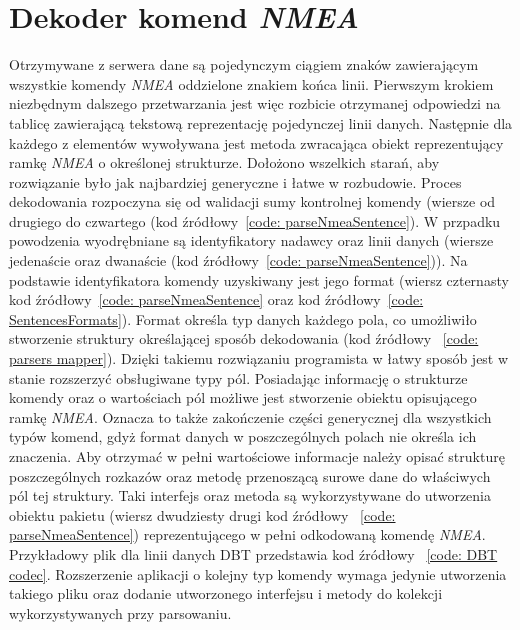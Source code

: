 \documentclass[skorowidz,skroty]{dyplomWEZUT}
\begin{document}
\section{Dekoder komend \textit{NMEA}}\label{sec: NMEA parser}
Otrzymywane z serwera dane są pojedynczym ciągiem znaków zawierającym wszystkie komendy \textit{NMEA} oddzielone znakiem końca linii. Pierwszym krokiem niezbędnym dalszego przetwarzania jest więc rozbicie otrzymanej odpowiedzi na tablicę zawierającą tekstową reprezentację pojedynczej linii danych. Następnie dla każdego z elementów wywoływana jest metoda zwracająca obiekt reprezentujący ramkę \textit{NMEA} o określonej strukturze. Dołożono wszelkich starań, aby rozwiązanie było jak najbardziej generyczne i łatwe w rozbudowie. Proces dekodowania rozpoczyna się od walidacji sumy kontrolnej komendy (wiersze od drugiego do czwartego (kod źródłowy~\ref{code: parseNmeaSentence}). W przpadku powodzenia wyodrębniane są identyfikatory nadawcy oraz linii danych (wiersze jedenaście oraz dwanaście (kod źródłowy~\ref{code: parseNmeaSentence})). Na podstawie identyfikatora komendy uzyskiwany jest jego format (wiersz czternasty kod źródłowy~\ref{code: parseNmeaSentence} oraz kod źródłowy~\ref{code: SentencesFormats}). Format określa typ danych każdego pola, co umożliwiło stworzenie struktury określającej sposób dekodowania (kod źródłowy ~\ref{code: parsers mapper}). Dzięki takiemu rozwiązaniu programista w łatwy sposób jest w stanie rozszerzyć obsługiwane typy pól. Posiadając informację o strukturze komendy oraz o wartościach pól możliwe jest stworzenie obiektu opisującego ramkę \textit{NMEA}. Oznacza to także zakończenie części generycznej dla wszystkich typów komend, gdyż format danych w poszczególnych polach nie określa ich znaczenia. Aby otrzymać w pełni wartościowe informacje należy opisać strukturę poszczególnych rozkazów oraz metodę przenoszącą surowe dane do właściwych pól tej struktury. Taki interfejs oraz metoda są wykorzystywane do utworzenia obiektu pakietu (wiersz dwudziesty drugi kod źródłowy ~\ref{code: parseNmeaSentence}) reprezentującego w pełni odkodowaną komendę \textit{NMEA}. Przykładowy plik dla linii danych DBT przedstawia kod źródłowy ~\ref{code: DBT codec}. Rozszerzenie aplikacji o kolejny typ komendy wymaga jedynie utworzenia takiego pliku oraz dodanie utworzonego interfejsu i metody do kolekcji wykorzystywanych przy parsowaniu.
\end{document}
